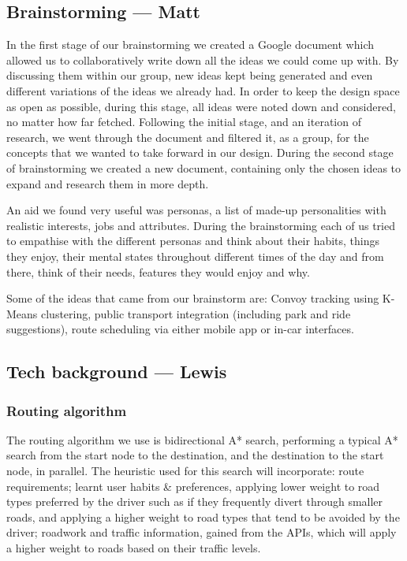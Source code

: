 \documentclass{article}
\begin{document}
\subsection{Brainstorming --- Matt}\label{ssec:nav-brainstorming}
In the first stage of our brainstorming we created a Google document which allowed us to collaboratively write down all the ideas we could come up with. By discussing them within our group, new ideas kept being generated and even different variations of the ideas we already had. In order to keep the design space as open as possible, during this stage, all ideas were noted down and considered, no matter how far fetched. Following the initial stage, and an iteration of research, we went through the document and filtered it, as a group, for the concepts that we wanted to take forward in our design. During the second stage of brainstorming we created a new document, containing only the chosen ideas to expand and research them in more depth.

An aid we found very useful was personas, a list of made-up personalities with realistic interests, jobs and attributes. During the brainstorming each of us tried to empathise with the different personas and think about their habits, things they enjoy, their mental states throughout different times of the day and from there, think of their needs, features they would enjoy and why.

Some of the ideas that came from our brainstorm are: Convoy tracking using K-Means clustering, public transport integration (including park and ride suggestions), route scheduling via either mobile app or in-car interfaces.

\subsection{Tech background --- Lewis}\label{ssec:nav-tech}
\subsubsection{Routing algorithm}\label{sssec:nav-tech-routing}
The routing algorithm we use is bidirectional A* search, performing a typical A* search from the start node to the destination, and the destination to the start node, in parallel. The heuristic used for this search will incorporate:
route requirements;
learnt user habits \& preferences, applying lower weight to road types preferred by the driver such as if they frequently divert through smaller roads, and applying a higher weight to road types that tend to be avoided by the driver;
roadwork and traffic information, gained from the APIs, which will apply a higher weight to roads based on their traffic levels.
\end{document}
